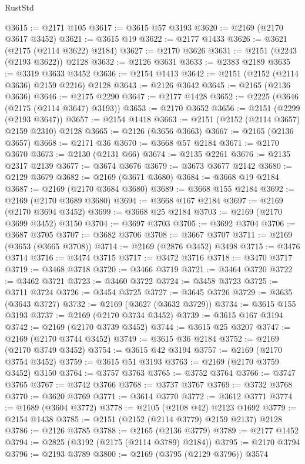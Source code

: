 \begin{lexlean}{RustStd}
\begin{coremodule}
@3615 := @2171 @105
@3617 := @3615 @57 @3193
@3620 := @2169 (@2170 @3617 @3452)
@3621 := @3615 @19
@3622 := @2177 @1433
@3626 := @3621 (@2175 (@2114 @3622) @2184)
@3627 := @2170 @3626
@3631 := @2151 (@2243 (@2193 @3622)) @2128
@3632 := @2126 @3631
@3633 := @2383 @2189
@3635 := @3319 @3633 @3452
@3636 := @2154 @1413
@3642 := @2151 (@2152 (@2114 @3636) @2159 @2216) @2128
@3643 := @2126 @3642
@3645 := @2165 (@2136 @3636)
@3646 := @2175 @2290
@3647 := @2177 @1428
@3652 := @2225 (@3646 (@2175 (@2114 @3647) @3193))
@3653 := @2170 @3652
@3656 := @2151 (@2299 (@2193 @3647))
@3657 := @2154 @1418
@3663 := @2151 (@2152 (@2114 @3657) @2159 @2310) @2128
@3665 := @2126 (@3656 @3663)
@3667 := @2165 (@2136 @3657)
@3668 := @2171 @36
@3670 := @3668 @57 @2184
@3671 := @2170 @3670
@3673 := @2130 (@2131 @66)
@3674 := @2135 @2261
@3676 := @2135 @2317 @2139
@3677 := @3674 @3676
@3679 := @3673 @3677 @2142
@3680 := @2129 @3679
@3682 := @2169 (@3671 @3680)
@3684 := @3668 @19 @2184
@3687 := @2169 (@2170 @3684 @3680)
@3689 := @3668 @155 @2184
@3692 := @2169 (@2170 @3689 @3680)
@3694 := @3668 @167 @2184
@3697 := @2169 (@2170 @3694 @3452)
@3699 := @3668 @25 @2184
@3703 := @2169 (@2170 @3699 @3452) @3150
@3704 := @3697 @3703
@3705 := @3692 @3704
@3706 := @3687 @3705
@3707 := @3682 @3706
@3708 := @3667 @3707
@3711 := @2169 (@3653 (@3665 @3708))
@3714 := @2169 (@2876 @3452) @3498
@3715 := @3476 @3714
@3716 := @3474 @3715
@3717 := @3472 @3716
@3718 := @3470 @3717
@3719 := @3468 @3718
@3720 := @3466 @3719
@3721 := @3464 @3720
@3722 := @3462 @3721
@3723 := @3460 @3722
@3724 := @3458 @3723
@3725 := @3711 @3724
@3726 := @3454 @3725
@3727 := @3645 @3726
@3729 := @3635 (@3643 @3727)
@3732 := @2169 (@3627 (@3632 @3729))
@3734 := @3615 @155 @3193
@3737 := @2169 (@2170 @3734 @3452)
@3739 := @3615 @167 @3194
@3742 := @2169 (@2170 @3739 @3452)
@3744 := @3615 @25 @3207
@3747 := @2169 (@2170 @3744 @3452)
@3749 := @3615 @36 @2184
@3752 := @2169 (@2170 @3749 @3452)
@3754 := @3615 @42 @3194
@3757 := @2169 (@2170 @3754 @3452)
@3759 := @3615 @51 @3193
@3763 := @2169 (@2170 @3759 @3452) @3150
@3764 := @3757 @3763
@3765 := @3752 @3764
@3766 := @3747 @3765
@3767 := @3742 @3766
@3768 := @3737 @3767
@3769 := @3732 @3768
@3770 := @3620 @3769
@3771 := @3614 @3770
@3772 := @3612 @3771
@3774 := @1689 (@3604 @3772)
@3778 := @2105 (@2108 @42) @2123 @1692
@3779 := @2154 @1438
@3785 := @2151 (@2152 (@2114 @3779) @2159 @2137) @2128
@3786 := @2126 @3785
@3788 := @2165 (@2136 @3779)
@3789 := @2177 @1452
@3794 := @2825 (@3192 (@2175 (@2114 @3789) @2184))
@3795 := @2170 @3794
@3796 := @2193 @3789
@3800 := @2169 (@3795 (@2129 @3796)) @3574

\end{coremodule}
\end{lexlean}
